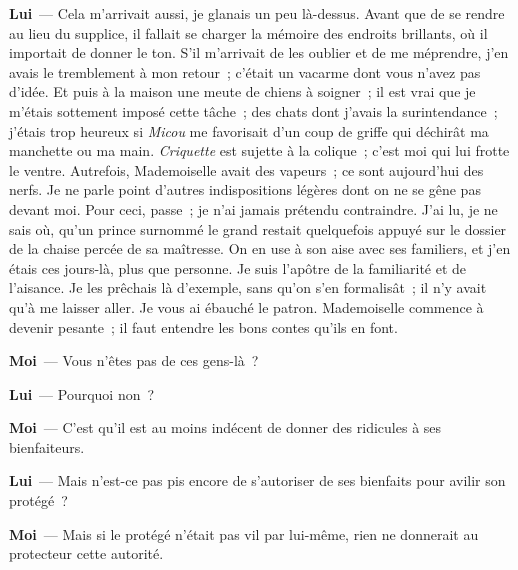 \documentclass[french,twoside]{book} %
\newcommand{\labelchar}[1]{\textbf{\color{rubric} #1}}
\begin{document}
\labelchar{Lui} — Cela m’arrivait aussi, je glanais un peu là-dessus. Avant que de se rendre au lieu du supplice, il fallait se charger la mémoire des endroits brillants, où il importait de donner le ton. S’il m’arrivait de les oublier et de me méprendre, j’en avais le tremblement à mon retour ; c’était un vacarme dont vous n’avez pas d’idée. Et puis à la maison une meute de chiens à soigner ; il est vrai que je m’étais sottement imposé cette tâche ; des chats dont j’avais la surintendance ; j’étais trop heureux si \emph{Micou} me favorisait d’un coup de griffe qui déchirât ma manchette ou ma main. \emph{Criquette} est sujette à la colique ; c’est moi qui lui frotte le ventre. Autrefois, Mademoiselle avait des vapeurs ; ce sont aujourd’hui des nerfs. Je ne parle point d’autres indispositions légères dont on ne se gêne pas devant moi. Pour ceci, passe ; je n’ai jamais prétendu contraindre. J’ai lu, je ne sais où, qu’un prince surnommé le grand restait quelquefois appuyé sur le dossier de la chaise percée de sa maîtresse. On en use à son aise avec ses familiers, et j’en étais ces jours-là, plus que personne. Je suis l’apôtre de la familiarité et de l’aisance. Je les prêchais là d’exemple, sans qu’on s’en formalisât ; il n’y avait qu’à me laisser aller. Je vous ai ébauché le patron. Mademoiselle commence à devenir pesante ; il faut entendre les bons contes qu’ils en font.\par
\labelchar{Moi} — Vous n’êtes pas de ces gens-là ?\par
\labelchar{Lui} — Pourquoi non ?\par
\labelchar{Moi} — C’est qu’il est au moins indécent de donner des ridicules à ses bienfaiteurs.\par
\labelchar{Lui} — Mais n’est-ce pas pis encore de s’autoriser de ses bienfaits pour avilir son protégé ?\par
\labelchar{Moi} — Mais si le protégé n’était pas vil par lui-même, rien ne donnerait au protecteur cette autorité.\par
\end{document}
